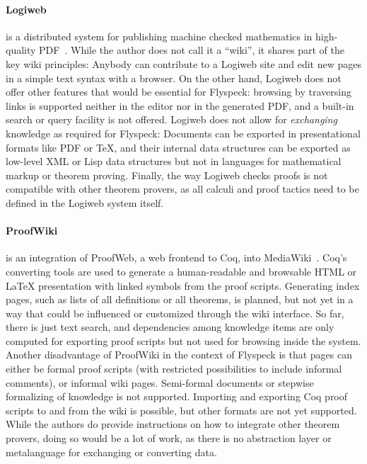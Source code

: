 \paragraph{Logiweb} is a distributed system for publishing machine checked mathematics in
high-quality PDF~\cite{Grue:Logiweb07}.  While the author does not call it a ``wiki'', it
shares part of the key wiki principles: Anybody can contribute to a Logiweb site and edit
new pages in a simple text syntax with a browser.  On the other hand, Logiweb does not
offer other features that would be essential for Flyspeck: browsing by traversing links is
supported neither in the editor nor in the generated PDF, and a built-in search or query
facility is not offered.  Logiweb does not allow for \emph{exchanging} knowledge as
required for Flyspeck: Documents can be exported in presentational formats like PDF or
\TeX{}, and their internal data structures can be exported as low-level XML or Lisp data
structures but not in languages for mathematical markup or theorem proving.  Finally, the
way Logiweb checks proofs is not compatible with other theorem provers, as all calculi and
proof tactics need to be defined in the Logiweb system itself.

\paragraph{ProofWiki} is an integration of ProofWeb, a web frontend to Coq, into
MediaWiki~\cite{CorKal:CoopReposFormalProofs07}.  Coq's converting tools are used to
generate a human-readable and browsable HTML or {\LaTeX} presentation with linked symbols
from the proof scripts.  Generating index pages, such as lists of all definitions or all
theorems, is planned, but not yet in a way that could be influenced or customized through
the wiki interface.  So far, there is just text search, and dependencies among knowledge
items are only computed for exporting proof scripts but not used for browsing inside the
system.  Another disadvantage of ProofWiki in the context of Flyspeck is that pages can
either be formal proof scripts (with restricted possibilities to include informal
comments), or informal wiki pages.  Semi-formal documents or stepwise formalizing of
knowledge is not supported.  Importing and exporting Coq proof scripts to and from the
wiki is possible, but other formats are not yet supported.  While the authors do provide
instructions on how to integrate other theorem provers, doing so would be a lot of work,
as there is no abstraction layer or metalanguage for exchanging or converting data.


